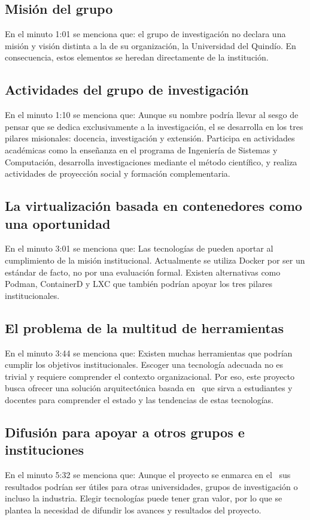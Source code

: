 \subsection{Misión del grupo \GRID}
En el minuto 1:01 se menciona que: el grupo de investigación no declara una misión y visión distinta a la de su organización, la Universidad del Quindío. En consecuencia, estos elementos se heredan directamente de la institución.

\subsection{Actividades del grupo de investigación}
En el minuto 1:10 se menciona que: Aunque su nombre podría llevar al sesgo de pensar que se dedica exclusivamente a la investigación, el \GRID se desarrolla en los tres pilares misionales: docencia, investigación y extensión. Participa en actividades académicas como la enseñanza en el programa de Ingeniería de Sistemas y Computación, desarrolla investigaciones mediante el método científico, y realiza actividades de proyección social y formación complementaria.

\subsection{La virtualización basada en contenedores como una oportunidad}
En el minuto 3:01 se menciona que: Las tecnologías de \VBC pueden aportar al cumplimiento de la misión institucional. Actualmente se utiliza Docker por ser un estándar de facto, no por una evaluación formal. Existen alternativas como Podman, ContainerD y LXC que también podrían apoyar los tres pilares institucionales.

\subsection{El problema de la multitud de herramientas}
En el minuto 3:44 se menciona que: Existen muchas herramientas que podrían cumplir los objetivos institucionales. Escoger una tecnología adecuada no es trivial y requiere comprender el contexto organizacional. Por eso, este proyecto busca ofrecer una solución arquitectónica basada en \VBC\, que sirva a estudiantes y docentes para comprender el estado y las tendencias de estas tecnologías.

\subsection{Difusión para apoyar a otros grupos e instituciones}
En el minuto 5:32 se menciona que: Aunque el proyecto se enmarca en el \GRID\, sus resultados podrían ser útiles para otras universidades, grupos de investigación o incluso la industria. Elegir tecnologías \VBC{} puede tener gran valor, por lo que se plantea la necesidad de difundir los avances y resultados del proyecto.

